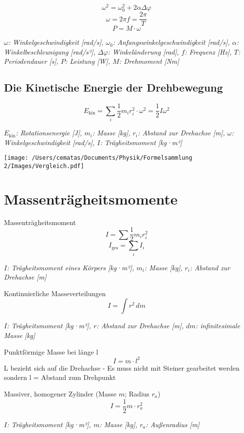 \documentclass[a4paper,10pt]{article}
\newenvironment{displayformula}
{
	\begin{framed}
		\color{formulaColor}
	}
	{\end{framed}}
\newcommand{\formulalegend}[1]{%
	\par\vspace{0.5ex}%
	{{\color{legendColor}\RaggedRight\small\textit{#1}}}%
	\par\vspace{1.5ex}%
}
\begin{document}
\begin{displayformula}
	\[
	\omega^2 = \omega_0^2 + 2\alpha \Delta\varphi
	\]
	\[
	\omega = 2\pi f = \frac{2\pi}{T}
	\]
	\[
	P = M \cdot \omega
	\]
\end{displayformula}
\formulalegend{
	\( \omega \): Winkelgeschwindigkeit [rad/s], \( \omega_0 \): Anfangswinkelgeschwindigkeit [rad/s], \( \alpha \): Winkelbeschleunigung [rad/s²], \( \Delta \varphi \): Winkeländerung [rad], \( f \): Frequenz [Hz], \( T \): Periodendauer [s], \( P \): Leistung [W], \( M \): Drehmoment [Nm]
}

\subsection{Die Kinetische Energie der Drehbewegung}

\begin{displayformula}
	\[
	E_{\text{kin}} = \sum_i \frac{1}{2} m_i r_i^2 \cdot \omega^2 = \frac{1}{2} I \omega^2
	\]
\end{displayformula}
\formulalegend{
	\( E_{\text{kin}} \): Rotationsenergie [J], \( m_i \): Masse [kg], \( r_i \): Abstand zur Drehachse [m], \( \omega \): Winkelgeschwindigkeit [rad/s], \( I \): Trägheitsmoment [kg·m²]
}


	\texttt{[image: /Users/cematas/Documents/Physik/Formelsammlung 2/Images/Vergleich.pdf]}


\newpage

\section{Massenträgheitsmomente}

\begin{displayformula}
	Massenträgheitsmoment
	\[
	I = \sum \frac{1}{2} m_i r_i^2 
	\]
	\[
	I_{\text{ges}} = \sum_i I_i
	\]
\end{displayformula}
\formulalegend{
	\( I \): Trägheitsmoment eines Körpers [kg·m²], \( m_i \): Masse [kg], \( r_i \): Abstand zur Drehachse [m]
}

\begin{displayformula}
	Kontinuierliche Masseverteilungen
	\[
	I = \int r^2 \, dm
	\]
\end{displayformula}
\formulalegend{
	\( I \): Trägheitsmoment [kg·m²], \( r \): Abstand zur Drehachse [m], \( dm \): infinitesimale Masse [kg]
}

\begin{displayformula}
	Punktförmige Masse bei länge l
	\[
	I = m \cdot l^2
	\]
	L bezieht sich auf die Drehachse - Es muss nicht mit Steiner gearbeitet werden sondern l = Abstand zum Drehpunkt
\end{displayformula}
\begin{displayformula}
	Massiver, homogener Zylinder (Masse \( m \); Radius \( r_a \))
	\[
	I = \frac{1}{2} m \cdot r_a^2
	\]
\end{displayformula}
\formulalegend{
	\( I \): Trägheitsmoment [kg·m²], \( m \): Masse [kg], \( r_a \): Außenradius [m]
}
\end{document}
